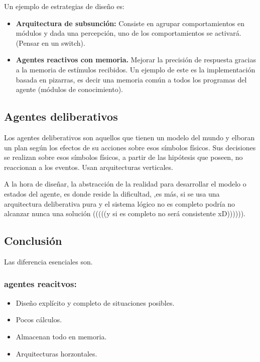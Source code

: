 \documentclass[12 pt, a4paper]{article}
\begin{document}
Un ejemplo de estrategias de diseño es: 

\begin{itemize}
  \item  \textbf{Arquitectura de subsunción:} Consiste en agrupar comportamientos en módulos y dada una percepción, uno de los comportamientos se activará. (Pensar en un switch).
  \item  \textbf{Agentes reactivos con memoria.} Mejorar la precisión de respuesta gracias a la memoria de estímulos recibidos. 
  Un ejemplo de este es la implementación basada en pizarras, es decir una memoria común a todos los programas del agente (módulos de conocimiento).
\end{itemize}

\subsection{Agentes deliberativos}

Los agentes deliberativos son aquellos que tienen un modelo del mundo y elboran un plan según los efectos de
su acciones sobre esos símbolos físicos. Sus decisiones se realizan sobre esos símbolos físicos, a partir de las hipótesis que poseen,
no reaccionan a los eventos. 
Usan arquitecturas verticales.

A la hora de diseñar, la abstracción de la realidad para desarrollar el modelo  o estados del agente, es donde reside la dificultad, 
,es más, si se usa una arquitectura deliberativa pura y el sistema lógico no es completo podría no alcanzar nunca una solución (((((y si es completo no será consistente xD)))))). 



\subsection*{Conclusión}
Las diferencia esenciales son. 

\subsubsection*{agentes reacitvos: }

\begin{itemize}
  \item Diseño explícito y completo de situaciones posibles.
  \item Pocos cálculos.
  \item Almacenan todo en memoria.
  \item Arquitecturas horzontales.
\end{itemize}
\end{document}
